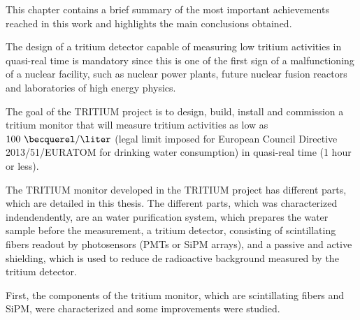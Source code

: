 This chapter contains a brief summary of the most important achievements reached in this work and highlights the main conclusions obtained.

The design of a tritium detector capable of measuring low tritium activities in quasi-real time is mandatory since this is one of the first sign of a malfunctioning of a nuclear facility, such as nuclear power plants, future nuclear fusion reactors and laboratories of high energy physics.

The goal of the TRITIUM project is to design, build, install and commission a tritium monitor that will measure tritium activities as low as $100~\becquerel/\liter$ (legal limit imposed for European Council Directive 2013/51/EURATOM for drinking water consumption) in quasi-real time (1 hour or less).

The TRITIUM monitor developed in the TRITIUM project has different parts, which are detailed in this thesis. The different parts, which was characterized indendendently, are an water purification system, which prepares the water sample before the measurement, a tritium detector, consisting of scintillating fibers readout by photosensors (PMTs or SiPM arrays), and a passive and active shielding, which is used to reduce de radioactive background measured by the tritium detector.

First, the components of the tritium monitor, which are scintillating fibers and SiPM, were characterized and some improvements were studied.

